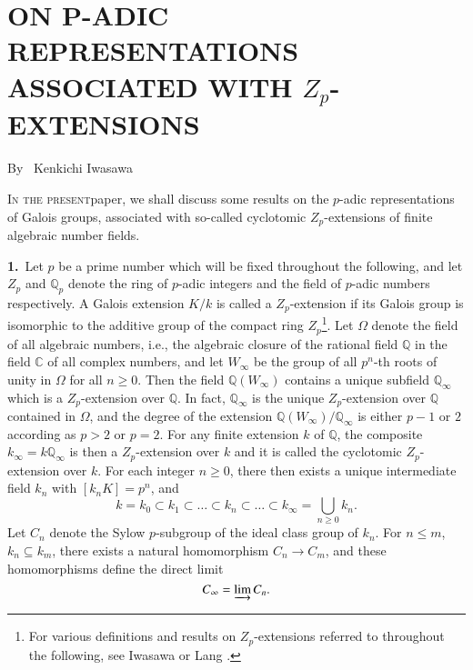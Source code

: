 \chapter{ON P-ADIC REPRESENTATIONS ASSOCIATED WITH $Z_{p}$-EXTENSIONS}\label{art-4}

\begin{center}
{\large By~ Kenkichi Iwasawa}
\end{center}

\bigskip

\setcounter{pageoriginal}{140}
\textsc{In the present}\pageoriginale paper, we shall discuss some results on the $p$-adic representations of Galois groups, associated with so-called cyclotomic $Z_{p}$-extensions of finite algebraic number fields.

\smallskip
{\bf 1.}~Let $p$ be a prime number which will be fixed throughout the following, and let $Z_{p}$ and $\mathbb{Q}_{p}$ denote the ring of $p$-adic integers and the field of $p$-adic numbers respectively. A Galois extension $K/k$ is called a $Z_{p}$-extension if its Galois group is isomorphic to the additive group of the compact ring $Z_{p}$\footnote[1]{For various definitions and results on $Z_{p}$-extensions referred to throughout the following, see Iwasawa \cite{art4-key5} or Lang \cite{art4-key6}.}. Let $\Omega$ denote the field of all algebraic numbers, i.e., the algebraic closure of the rational field $\mathbb{Q}$ in the field $\mathbb{C}$ of all complex numbers, and let $W_{\infty}$ be the group of all $p^{n}$-th roots of unity in $\Omega$ for all $n\geq 0$. Then the field $\mathbb{Q}(W_{\infty})$ contains a unique subfield $\mathbb{Q}_{\infty}$ which is a $Z_{p}$-extension over $\mathbb{Q}$. In fact, $\mathbb{Q}_{\infty}$ is the unique $Z_{p}$-extension over $\mathbb{Q}$ contained in $\Omega$, and the degree of the extension $\mathbb{Q}(W_{\infty})/\mathbb{Q}_{\infty}$ is either $p-1$ or $2$ according as $p>2$ or $p=2$. For any finite extension $k$ of $\mathbb{Q}$, the composite $k_{\infty}=k\mathbb{Q}_{\infty}$ is then a $Z_{p}$-extension over $k$ and it is called the cyclotomic $Z_{p}$-extension over $k$. For each integer $n\geq 0$, there then exists a unique intermediate field $k_{n}$ with $[k_{n}K]=p^{n}$, and
$$
k=k_{0}\subset k_{1}\subset\ldots\subset k_{n}\subset\ldots\subset k_{\infty}=\bigcup\limits_{n\geq 0}k_{n}.
$$
Let $C_{n}$ denote the Sylow $p$-subgroup of the ideal class group of $k_{n}$. For $n\leq m$, $k_{n}\subseteq k_{m}$, there exists a natural homomorphism $C_{n}\to C_{m}$, and these homomorphisms define the direct limit
$$
C_{\infty}=\varinjlim C_{n}.
$$ 

